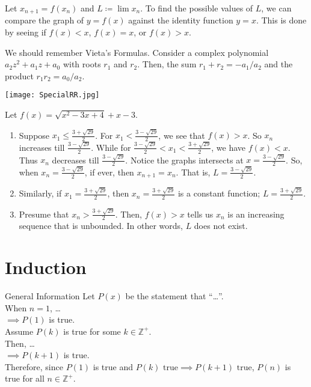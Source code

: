 \documentclass[oneside]{book}
\begin{document}
\begin{note}
  Let \(x_{n+1}=f(x_n)\) and \(L\coloneq \lim{x_n}\). To find the possible values of \(L\), we can compare the graph of \(y=f(x)\) against the identity function \(y=x\). This is done by seeing if \(f(x)<x\), \(f(x)=x\), or \(f(x)>x\).
\end{note}
\begin{note}
  We should remember Vieta's Formulas. Consider a complex polynomial \(a_2 z^2+a_1 z+a_0\) with roots \(r_1\) and \(r_2\). Then, the sum \(r_1+r_2=-a_1/a_2\) and the product \(r_1r_2=a_0/a_2\).
\end{note}
\begin{example}{}{}
  \begin{center}
    \texttt{[image: SpecialRR.jpg]}
  \end{center}
  Let \(f(x)=\sqrt{x^2-3x+4}+x-3\).
  \begin{enumerate}
    \item Suppose \(x_1 \leq \frac{3+\sqrt{29}}{2}\). For \(x_1<\frac{3-\sqrt{29}}{2}\), we see that \(f(x)>x\). So \(x_n\) increases till \(\frac{3-\sqrt{29}}{2}\). While for \(\frac{3-\sqrt{29}}{2}<x_1<\frac{3+\sqrt{29}}{2}\), we have \(f(x)<x\). Thus \(x_n\) decreases till \(\frac{3-\sqrt{29}}{2}\). Notice the graphs intersects at \(x=\frac{3-\sqrt{29}}{2}\). So, when \(x_n=\frac{3-\sqrt{29}}{2}\), if ever, then \(x_{n+1}=x_n\). That is, \(L=\frac{3-\sqrt{29}}{2}\).
    \item Similarly, if \(x_1=\frac{3+\sqrt{29}}{2}\), then \(x_n=\frac{3+\sqrt{29}}{2}\) is a constant function; \(L=\frac{3+\sqrt{29}}{2}\).
    \item Presume that \(x_n>\frac{3+\sqrt{29}}{2}\). Then, \(f(x)>x\) tells us \(x_n\) is an increasing sequence that is unbounded. In other words, \(L\) does not exist.
  \end{enumerate}
\end{example}

\chapter{Induction}
\begin{stbox}{General Information}
  Let \(P(x)\) be the statement that ``\ldots''.\\[3mm] 
  When \(n=1\), \ldots\\[3mm]
  \(\implies P(1)\) is true.\\[3mm]
  Assume \(P(k)\) is true for some \(k \in \mathbb{Z}^{+}\).\\[3mm]
  Then, \ldots\\[3mm]
  \(\implies P(k+1)\) is true.\\[3mm]
  Therefore, since \(P(1)\) is true and \(P(k)\text{ true}\implies P(k+1)\text{ true}\), \(P(n)\) is true for all \(n \in \mathbb{Z}^{+}\).
\end{stbox}
\end{document}
